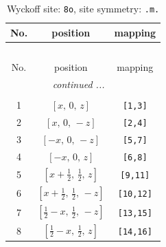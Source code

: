 \documentclass[fleqn,8pt]{jsarticle}
\begin{document}
\begin{longtable}{ccc}
\caption{Wyckoff site: {\tt 8o}, site symmetry: {\tt .m.}}
 \\
 \hline \hline
No. & position & mapping \\ \hline \endfirsthead

\multicolumn{2}{l}{\tablename\ \thetable{}} \\
 \hline \hline
No. & position & mapping \\ \hline \endhead

 \hline \hline
\multicolumn{2}{r}{\footnotesize\it continued ...} \\ \endfoot

 \hline \hline
\multicolumn{2}{r}{} \\ \endlastfoot

1 & $\left[ x,\, 0,\, z \right]$ & {\tt [1,3]} \\ \hline
2 & $\left[ x,\, 0,\, - z \right]$ & {\tt [2,4]} \\ \hline
3 & $\left[ - x,\, 0,\, - z \right]$ & {\tt [5,7]} \\ \hline
4 & $\left[ - x,\, 0,\, z \right]$ & {\tt [6,8]} \\ \hline
5 & $\left[ x + \frac{1}{2},\, \frac{1}{2},\, z \right]$ & {\tt [9,11]} \\ \hline
6 & $\left[ x + \frac{1}{2},\, \frac{1}{2},\, - z \right]$ & {\tt [10,12]} \\ \hline
7 & $\left[ \frac{1}{2} - x,\, \frac{1}{2},\, - z \right]$ & {\tt [13,15]} \\ \hline
8 & $\left[ \frac{1}{2} - x,\, \frac{1}{2},\, z \right]$ & {\tt [14,16]} \\
\end{longtable}
\renewcommand{\arraystretch}{1.2}
\end{document}
